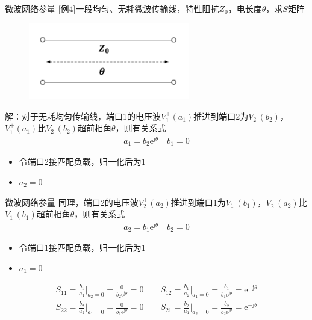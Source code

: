 \begin{frame}{微波网络参量}
    [例4]\quad 一段均匀、无耗微波传输线，特性阻抗$Z_0$，电长度$\theta$，求$S$矩阵
    \begin{figure}
        \includegraphics[width=7cm]{Cha5//fig5-17.pdf}
    \end{figure}
    解：对于无耗均匀传输线，端口1的电压波$V_1^+(a_1)$推进到端口2为$V_2^-(b_2)$，$V_1^+(a_1)$比$V_2^-(b_2)$超前相角$\theta$，则有关系式
    \begin{align*}
        a_1=b_2\mathrm{e}^{\mathrm{j}\theta}\quad b_1=0
    \end{align*}
    \begin{itemize}
        \item 令端口2接匹配负载，归一化后为1
        \item $a_2=0$
    \end{itemize}
\end{frame}

\begin{frame}{微波网络参量}
    同理，端口2的电压波$V_2^+(a_2)$推进到端口1为$V_1^-(b_1)$，$V_2^+(a_2)$比$V_1^-(b_1)$超前相角$\theta$，则有关系式
    \begin{align*}
        a_2=b_1\mathrm{e}^{\mathrm{j}\theta}\quad b_2=0
    \end{align*}
    \begin{itemize}
        \item 令端口1接匹配负载，归一化后为1
        \item $a_1=0$
    \end{itemize}
    \begin{align*}
        S_{11}=\frac{b_1}{a_1}\bigg|_{a_2=0}=\frac{0}{b_2\mathrm{e}^{\mathrm{j}\theta}}=0\qquad
        S_{12}=\frac{b_1}{a_2}\bigg|_{a_1=0}=\frac{b_1}{b_1\mathrm{e}^{\mathrm{j}\theta}}=\mathrm{e}^{-\mathrm{j}\theta} \\
        S_{22}=\frac{b_2}{a_2}\bigg|_{a_1=0}=\frac{0}{b_1\mathrm{e}^{\mathrm{j}\theta}}=0\qquad
        S_{21}=\frac{b_2}{a_1}\bigg|_{a_2=0}=\frac{b_2}{b_2\mathrm{e}^{\mathrm{j}\theta}}=\mathrm{e}^{-\mathrm{j}\theta}
    \end{align*}
\end{frame}

